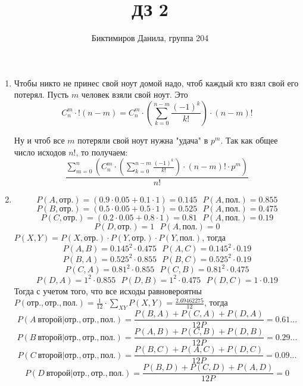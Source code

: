\documentclass[11pt]{article}
\begin{document}
	
	\author{Биктимиров Данила, группа 204}
	\title{ДЗ 2}
	\date{}
	\maketitle
	
	\medskip
	
	\begin{enumerate}
		
		\item Чтобы никто не принес свой ноут домой надо, чтоб каждый кто взял свой его потерял. Пусть $m$ человек взяли свой ноут. Это 
		$$C^m_n \cdot !(n-m) = C^m_n \cdot \left(\sum_{k=0}^{n-m}\frac{(-1)^k}{k!}\right) \cdot (n-m)!$$
		
		Ну и чтоб все $m$ потеряли свой ноут нужна "удача" в $p^m$. Так как общее число исходов $n!$, то получаем:
		$$\frac{\sum_{m=0}^{n}\left(C^m_n\cdot \left( \sum_{k=0}^{n-m} \frac{(-1)^k}{k!} \right) \cdot (n-m)!\cdot p^m \right)}{n!}$$
		
		\item
		$$P(A, \text{отр.})=(0.9 \cdot 0.05 + 0.1 \cdot 1)=0.145\:\:\: P(A, \text{пол.})=0.855$$
		$$P(B, \text{отр.})=(0.5 \cdot 0.05 + 0.5 \cdot 1)=0.525\:\:\: P(A, \text{пол.})=0.475$$
		$$P(C, \text{отр.})=(0.2 \cdot 0.05 + 0.8 \cdot 1)=0.81\:\:\: P(A, \text{пол.})=0.19$$
		$$P(D, \text{отр.})=1\:\:\: P(A, \text{пол.})=0$$
		$P(X,Y)=P(X,\text{отр.})\cdot P(Y,\text{отр.})\cdot P(Y,\text{пол.})$, тогда
		$$P(A,B)=0.145^2\cdot 0.475\:\:\: P(A,C)=0.145^2\cdot 0.19$$
		$$P(B,A)=0.525^2\cdot 0.855\:\:\: P(B,C)=0.525^2\cdot 0.19$$
		$$P(C,A)=0.81^2\cdot 0.855\:\:\: P(C,B)=0.81^2\cdot 0.475$$
		$$P(D,A)=1^2\cdot 0.855\:\:\: P(D,B)=1^2\cdot 0.475\:\:\: P(D,C)=1\cdot 0.19$$
		Тогда с учетом того, что все исходы равновероятны $P(\text{отр.},\text{отр.},\text{пол.})=\frac{1}{12}\cdot \sum_{XY} P(X,Y)=\frac{2.69462275}{12}$, тогда
		$$P(A\:\text{второй}|\text{отр.},\text{отр.},\text{пол.})=\frac{P(B,A) + P(C,A)+P(D,A)}{12P}=0.61...$$
		$$P(B\:\text{второй}|\text{отр.},\text{отр.},\text{пол.})=\frac{P(A,B) + P(C,B)+P(D,B)}{12P}=0.29...$$
		$$P(C\:\text{второй}|\text{отр.},\text{отр.},\text{пол.})=\frac{P(B,C) + P(A,C)+P(D,C)}{12P}=0.09...$$
		$$P(D\:\text{второй}|\text{отр.},\text{отр.},\text{пол.})=\frac{P(B,D) + P(C,D)+P(A,D)}{12P}=0$$
		
	\end{enumerate}
\end{document}
